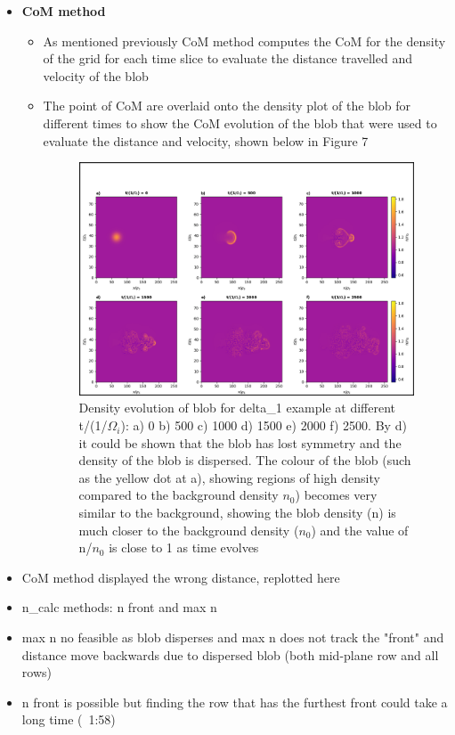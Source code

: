 \documentclass{article}
\begin{document}
\begin{arrowlist}
\begin{itemize}
            \item \textbf{CoM method}
            \begin{itemize}
                \item As mentioned previously CoM method computes the CoM for the density of the grid for each time slice to evaluate the distance travelled and velocity of the blob
                \item The point of CoM are overlaid onto the density plot of the blob for different times to show the CoM evolution of the blob that were used to evaluate the distance and velocity, shown below in Figure 7

    \begin{figure}[H]
        \centering
            \includegraphics[width=\textwidth]{./Fig/Fig6 n hmap t0_t50}
            \normalsize{\caption{Density evolution of blob for delta\_1 example at different t/(1/$\Omega_i$): a) 0 b) 500 c) 1000 d) 1500 e) 2000 f) 2500. By d) it could be shown that the blob has lost symmetry and the density of the blob is dispersed. The colour of the blob (such as the yellow dot at a), showing regions of high density compared to the background density $n_0$) becomes very similar to the background, showing the blob density (n) is much closer to the background density ($n_0$) and the value of n/$n_0$ is close to 1 as time evolves}
            \label{fig:fig6}}
        \end{figure}   
                
            \end{itemize}
            \item CoM method displayed the wrong distance, replotted here
            \item n\_calc methods: n front and max n
            \item max n no feasible as blob disperses and max n does not track the "front" and distance move backwards due to dispersed blob (both mid-plane row and all rows)
            \item n front is possible but finding the row that has the furthest front could take a long time (~1:58)
        \end{itemize}
    
\end{arrowlist}



\nocite{*}
\printbibliography[title={References}]
\end{document}
